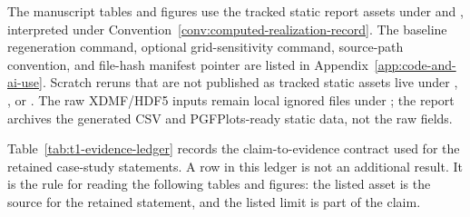 The manuscript tables and figures use the tracked static report assets under
 and
, interpreted under
Convention~\ref{conv:computed-realization-record}. The baseline regeneration
command, optional grid-sensitivity command, source-path convention, and
file-hash manifest pointer are listed in Appendix~\ref{app:code-and-ai-use}.
Scratch reruns that are not published as tracked static assets live under
, ,
or . The raw XDMF/HDF5 inputs remain local ignored
files under
; the report archives the generated CSV
and PGFPlots-ready static data, not the raw fields.

Table~\ref{tab:t1-evidence-ledger} records the claim-to-evidence contract used
for the retained case-study statements. A row in this ledger is not an
additional result. It is the rule for reading the following tables and figures:
the listed asset is the source for the retained statement, and the listed limit
is part of the claim.

